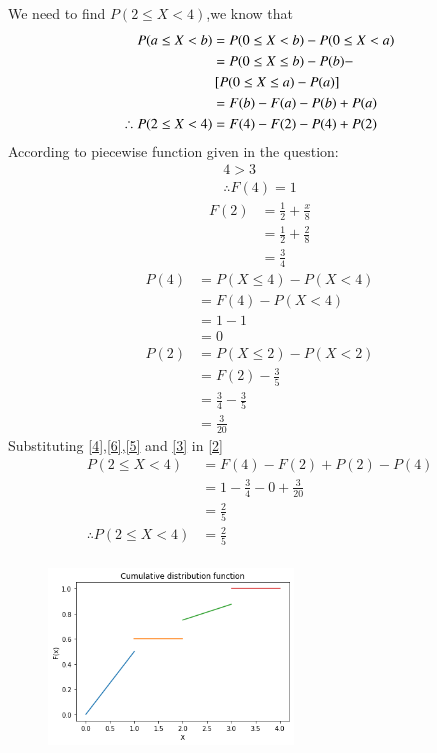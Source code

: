 \documentclass[journal,12pt,twocolumn]{IEEEtran}
\begin{document}
We need to find $P(2 \leq X <4)$,we know that\\
\begin{align}
P(a \leq X <b)&=P(0 \leq X <b)-P(0 \leq X < a)\\
&=P(0 \leq X \leq b) -P(b)- \notag \\
&{}\left[P(0 \leq X \leq a)-P(a)\right]\\
&=F(b)-F(a)-P(b)+P(a)\\
\therefore P(2 \leq X <4)&=F(4)-F(2)-P(4)+P(2) \label{2}
\end{align}
According to piecewise function given in the question:\\

\begin{align}
4>3\\
\therefore F(4)=1 \label{3}
\end{align}
\begin{align}
F(2)&=\frac{1}{2}+ \frac{x}{8}\\
 &=\frac{1}{2}+ \frac{2}{8}\\
 &=\frac{3}{4} \label{4}
\end{align}
\begin{align}
P(4)&=P(X \leq 4)- P(X < 4)\\
&=F(4)- P(X < 4)\\
&=1-1\\
&=0 \label{5}
\end{align}
\begin{align}
P(2)&=P(X \leq 2)- P(X < 2)\\
&=F(2)-\frac{3}{5}\\
&=\frac{3}{4}-\frac{3}{5}\\
&=\frac{3}{20} \label{6}
\end{align}
Substituting \eqref{4},\eqref{6},\eqref{5} and \eqref{3} in \eqref{2}
\begin{align}
P(2 \leq X <4)&=F(4)-F(2)+P(2)-P(4)\\
&=1-\frac{3}{4}-0+\frac{3}{20}\\
&=\frac{2}{5}\\
\therefore P(2 \leq X <4)&=\frac{2}{5}\\
\end{align}



\begin{figure}[htb!]
\begin{center}
\includegraphics[width=0.58\textwidth]{assignment2.png}
\end{center}
\end{figure}
\end{document}
